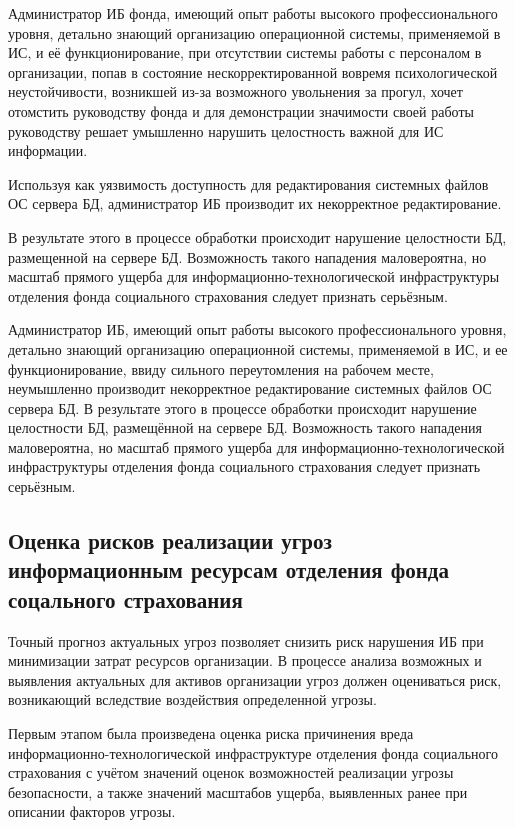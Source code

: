 \point Администратор ИБ фонда, имеющий опыт работы высокого
профессионального уровня, детально знающий организацию операционной
системы, применяемой в ИС, и её функционирование, при отсутствии
системы работы с персоналом в организации, попав в состояние
нескорректированной вовремя психологической неустойчивости, возникшей
из-за возможного увольнения за прогул, хочет отомстить руководству
фонда и для демонстрации значимости своей работы руководству решает
умышленно нарушить целостность важной для ИС информации.

Используя как уязвимость доступность для редактирования системных
файлов ОС сервера БД, администратор ИБ производит их некорректное
редактирование.

В результате этого в процессе обработки происходит нарушение
целостности БД, размещенной на сервере БД.  Возможность такого
нападения маловероятна, но масштаб прямого ущерба для
информационно-технологической инфраструктуры отделения фонда
социального страхования следует признать серьёзным.

\point Администратор ИБ, имеющий опыт работы высокого
профессионального уровня, детально знающий организацию операционной
системы, применяемой в ИС, и ее функционирование, ввиду сильного
переутомления на рабочем месте, неумышленно производит некорректное
редактирование системных файлов ОС сервера БД.  В результате этого в
процессе обработки происходит нарушение целостности БД, размещённой на
сервере БД.  Возможность такого нападения маловероятна, но масштаб
прямого ущерба для информационно-технологической инфраструктуры
отделения фонда социального страхования следует признать серьёзным.

\subsection{Оценка рисков реализации угроз информационным ресурсам
  отделения фонда соцального страхования}

\point Точный прогноз актуальных угроз позволяет снизить риск
нарушения ИБ при минимизации затрат ресурсов организации. В процессе
анализа возможных и выявления актуальных для активов организации угроз
должен оцениваться риск, возникающий вследствие воздействия
определенной угрозы.

\point Первым этапом была произведена оценка риска причинения вреда
информационно-технологической инфраструктуре отделения фонда
социального страхования с учётом значений оценок возможностей
реализации угрозы безопасности, а также значений масштабов ущерба,
выявленных ранее при описании факторов угрозы.

